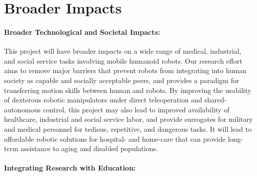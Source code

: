 \documentclass[letterpaper, 11 pt, onecolumn]{article}
\begin{document}
\section{Broader Impacts}\label{sec:impact}


\paragraph*{Broader Technological and Societal Impacts:} 

This project will have broader impacts on a wide range of medical, industrial, and social service tasks involving mobile humanoid robots. Our research effort aims to remove major barriers that prevent robots from integrating into human society as capable and socially acceptable peers, and provides a paradigm for transferring motion skills between human and robots. By improving the usability of dexterous robotic manipulators under direct teleoperation and shared-autonomous control, this project may also lead to improved availability of healthcare, industrial and social service labor, and provide surrogates for military and medical personnel for tedious, repetitive, and dangerous tasks. It will lead to affordable robotic solutions for hospital- and home-care that can provide long-term assistance to aging and disabled populations.

\paragraph*{Integrating Research with Education:} 
\end{document}
